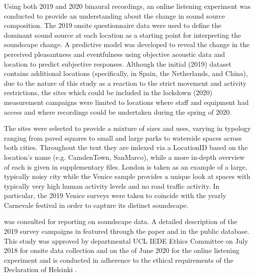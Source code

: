  Using both 2019 and 2020 binaural recordings, an online listening experiment was conducted to provide an understanding about the change in sound source composition. The 2019 onsite questionnaire data were used to define the dominant sound source at each location as a starting point for interpreting the soundscape change. A predictive model was developed to reveal the change in the perceived pleasantness and eventfulness using objective acoustic data and location to predict subjective responses. Although the initial (2019) dataset contains additional locations (specifically, in Spain, the Netherlands, and China), due to the nature of this study as a reaction to the strict movement and activity restrictions, the sites which could be included in the lockdown (2020) measurement campaigns were limited to locations where staff and equipment had access and where recordings could be undertaken during the spring of 2020.

 The sites were selected to provide a mixture of sizes and uses, varying in typology ranging from paved squares to small and large parks to waterside spaces across both cities. Throughout the text they are indexed via a LocationID based on the location's name (e.g. CamdenTown, SanMarco), while a more in-depth overview of each is given in supplementary files. %
 London is taken as an example of a large, typically noisy city while the Venice sample provides a unique look at spaces with typically very high human activity levels and no road traffic activity. In particular, the 2019 Venice surveys were taken to coincide with the yearly Carnevale festival in order to capture its distinct soundscape.

\citet{ISO12913Part2} was consulted for reporting on soundscape data. A detailed description of the 2019 survey campaigns in featured through the paper and in the public database. This study was approved by departmental UCL IEDE Ethics Committee on  July 2018 for onsite data collection and on the  of June 2020 for the online listening experiment and is conducted in adherence to the ethical requirements of the Declaration of Helsinki \citep{WMA2013World}.

